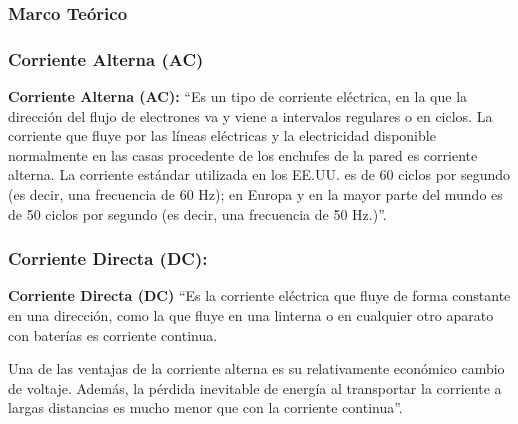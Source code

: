 \begin{frame}
\frametitle{Marco Teórico}
\subsubsection{Corriente Alterna (AC)}
{\small}
\textbf{Corriente Alterna (AC):}
``Es un tipo de corriente eléctrica, en la que la dirección del flujo de electrones va y viene a intervalos regulares o en ciclos. La corriente que fluye por las líneas eléctricas y la electricidad disponible normalmente en las casas procedente de los enchufes de la pared es corriente alterna. La corriente estándar utilizada en los EE.UU. es de 60 ciclos por segundo (es decir, una frecuencia de 60 Hz); en Europa y en la mayor parte del mundo es de 50 ciclos por segundo (es decir, una frecuencia de 50 Hz.)''. \cite{Cor}\newline

\subsubsection{Corriente Directa (DC):}
\textbf{Corriente Directa (DC)}
``Es la corriente eléctrica que fluye de forma constante en una dirección, como la que fluye en una linterna o en cualquier otro aparato con baterías es corriente continua.

Una de las ventajas de la corriente alterna es su relativamente económico cambio de voltaje. Además, la pérdida inevitable de energía al transportar la corriente a largas distancias es mucho menor que con la corriente continua''. \cite{Cor}
\end{frame}

